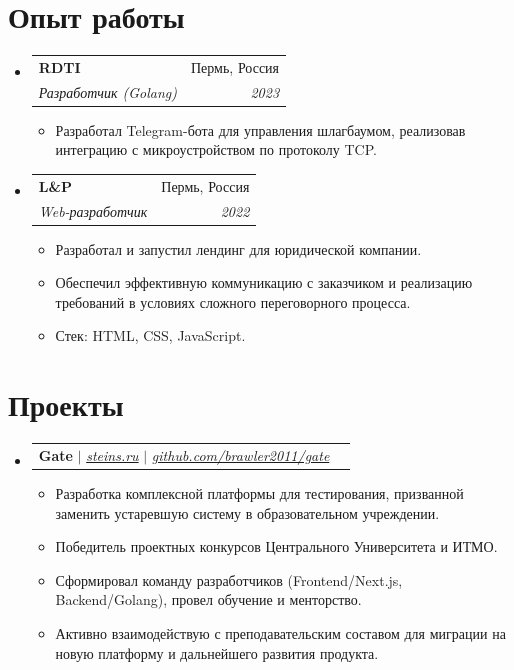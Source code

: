 \documentclass[letterpaper,11pt]{article}
\makeatletter
\newcommand{\resumeItem}[1]{
  \item\small{
    {#1 \vspace{-2pt}}
  }
}
\newcommand{\resumeSubheading}[4]{
  \vspace{-2pt}\item
    \begin{tabular*}{0.97\textwidth}[t]{l@{\extracolsep{\fill}}r}
      \textbf{#1} & #2 \\
      \textit{\small#3} & \textit{\small #4} \\
    \end{tabular*}\vspace{-7pt}
}
\newcommand{\resumeProjectHeading}[2]{
    \vspace{-2pt}\item
    \begin{tabular*}{0.97\textwidth}{l@{\extracolsep{\fill}}r}
      \small#1 & #2 \\
    \end{tabular*}\vspace{-7pt}
}
\newcommand{\resumeSubHeadingListStart}{\begin{itemize}[leftmargin=0.15in, label={}]}
\newcommand{\resumeSubHeadingListEnd}{\end{itemize}}
\newcommand{\resumeItemListStart}{\begin{itemize}}
\newcommand{\resumeItemListEnd}{\end{itemize}\vspace{-5pt}}
\makeatother
\begin{document}

\section{Опыт работы}
  \vspace{3pt}
  \resumeSubHeadingListStart

    \resumeSubheading
      {RDTI}{Пермь, Россия}
      {Разработчик (Golang)}{2023}
        \resumeItemListStart
            \resumeItem{Разработал Telegram-бота для управления шлагбаумом, реализовав интеграцию с микроустройством по протоколу TCP.}
        \resumeItemListEnd

    \resumeSubheading
      {L\&P}{Пермь, Россия}
      {Web-разработчик}{2022}
        \resumeItemListStart
            \resumeItem{Разработал и запустил лендинг для юридической компании.}
            \resumeItem{Обеспечил эффективную коммуникацию с заказчиком и реализацию требований в условиях сложного переговорного процесса.}
            \resumeItem{Стек: HTML, CSS, JavaScript.}
        \resumeItemListEnd

  \resumeSubHeadingListEnd


\section{Проекты}
    \vspace{3pt}
    \resumeSubHeadingListStart
      
      \resumeProjectHeading
        {\textbf{Gate} $|$ \emph{\href{https://steins.ru}{\color{blue}steins.ru}} $|$ \emph{\href{https://github.com/brawler2011/gate}{\color{blue}github.com/brawler2011/gate}}}{}
          \resumeItemListStart
            \resumeItem{Разработка комплексной платформы для тестирования, призванной заменить устаревшую систему в образовательном учреждении.}
            \resumeItem{Победитель проектных конкурсов Центрального Университета и ИТМО.}
            \resumeItem{Сформировал команду разработчиков (Frontend/Next.js, Backend/Golang), провел обучение и менторство.}
            \resumeItem{Активно взаимодействую с преподавательским составом для миграции на новую платформу и дальнейшего развития продукта.}
          \resumeItemListEnd
      
    \resumeSubHeadingListEnd


\end{document}
